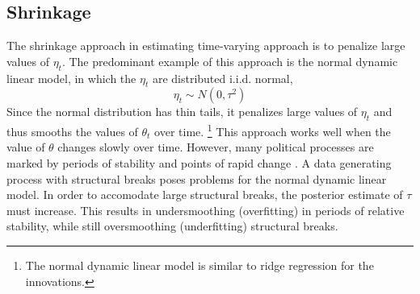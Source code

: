 \documentclass{article}
\begin{document}
\subsection{Shrinkage}
\label{sec:shrinkage}

The shrinkage approach in estimating time-varying approach is to penalize large values of $\eta_{t}$. 
The predominant example of this approach is the normal dynamic linear model, in which the $\eta_{t}$ are distributed i.i.d. normal,
\begin{equation}
  \label{eq:4}
  \eta_{t} \sim N(0, \tau^{2})
\end{equation}
Since the normal distribution has thin tails, it penalizes large values of $\eta_{t}$ and thus smooths the values of $\theta_{t}$ over time.
\footnote{The normal dynamic linear model is similar to ridge regression for the innovations.}
This approach works well when the value of $\theta$ changes slowly over time.
However, many political processes are marked by periods of stability and points of rapid change \parencite{RatkovicEng2010}.
A data generating process with structural breaks poses problems for the normal dynamic linear model.
In order to accomodate large structural breaks, the posterior estimate of $\tau$ must increase. 
This results in undersmoothing (overfitting) in periods of relative stability, while still oversmoothing (underfitting) structural breaks.
\end{document}
